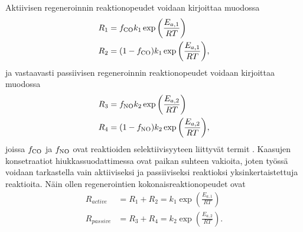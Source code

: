 

Aktiivisen regeneroinnin reaktionopeudet voidaan kirjoittaa muodossa
\begin{align}
    R_1 &= f_{\ce{CO}} k_1 \exp{\left( \frac{E_{a, 1}}{RT} \right)} \\%
    R_2 &= (1-f_{\ce{CO}}) k_1 \exp{\left( \frac{E_{a, 1}}{RT} \right)} ,%
\end{align}
ja vastaavasti passiivisen regeneroinnin reaktionopeudet voidaan kirjoittaa muodossa
\begin{align}
    R_3 &= f_{\ce{NO}} k_2 \exp{\left( \frac{E_{a, 2}}{RT} \right)} \\%
    R_4 &= (1-f_{\ce{NO}}) k_2 \exp{\left( \frac{E_{a, 2}}{RT} \right)}, %
\end{align}
joissa \( f_{\ce{CO}}\) ja \( f_{\ce{NO}}\) ovat reaktioiden selektiivisyyteen liittyvät termit \cite{ZhongChao2022Eaos} \cite{DengYuanwang2017Iogc}.
Kaasujen konsetraatiot hiukkassuodattimessa ovat paikan suhteen vakioita, joten työssä voidaan tarkastella vain aktiiviseksi ja passiiviseksi reaktioksi yksinkertaistettuja reaktioita.
Näin ollen regenerointien kokonaisreaktionopeudet ovat
\begin{align}
    R_{active} &= R_1 + R_2 =   k_1 \exp{\left( \frac{E_{a, 1}}{RT} \right)} \\%
    R_{passive} &= R_3+ R_4 =  k_2 \exp{\left( \frac{E_{a, 2}}{RT} \right)} . %
\end{align}


